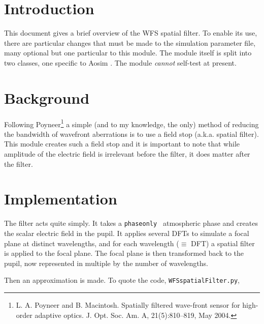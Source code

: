 \documentclass{article}
\begin{document}

\renewcommand{\esotitle}{WFS Spatial Filter}
\renewcommand{\esoauthorname}{Nazim Bharmal}
\renewcommand{\esodocno}{AOSIM-???-???-???}
\renewcommand{\releasedate}{2013/06/30}


\section{Introduction}

This document gives a brief overview of the WFS spatial filter. To enable
its use, there are particular changes that must be made to the simulation
parameter file, many optional but one particular to this module. The module
itself is split into two classes, one specific to {\sc Aosim }. The module
{\em cannot} self-test at present.

\section{Background}

Following Poyneer\footnote{L. A. Poyneer and B. Macintosh. Spatially ﬁltered
wave-front sensor for high-order adaptive optics. J.  Opt. Soc. Am. A,
21(5):810–819, May 2004.} a simple (and to my knowledge, the only) method of
reducing the bandwidth of wavefront aberrations is to use a field stop (a.k.a.
spatial filter). This module creates such a field stop and it is important to
note that while amplitude of the electric field is irrelevant before the
filter, it does matter after the filter.

\section{Implementation}

The filter acts quite simply. It takes a {\tt phaseonly } atmospheric phase
and creates the scalar electric field in the pupil. It applies several DFTs
to simulate a focal plane at distinct wavelengths, and for each wavelength
($\equiv$ DFT) a spatial filter is applied to the focal plane. The
focal plane is then transformed back to the pupil, now represented in
multiple by the number of wavelengths.

Then an approximation is made. To quote the code, {\tt WFSspatialFilter.py},
\end{document}
